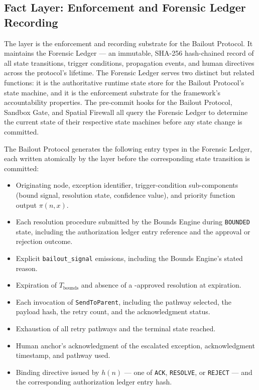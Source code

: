 \subsection{Fact Layer: Enforcement and Forensic Ledger Recording}
\label{sec:bailout-fact-layer}

The \factLayer{} layer is the enforcement and recording substrate for the Bailout
Protocol.  It maintains the Forensic Ledger --- an immutable, SHA-256
hash-chained record of all state transitions, trigger conditions, propagation
events, and human directives across the protocol's lifetime.  The Forensic
Ledger serves two distinct but related functions: it is the authoritative
runtime state store for the Bailout Protocol's state machine, and it is the
enforcement substrate for the framework's accountability properties.  The
pre-commit hooks for the Bailout Protocol, Sandbox Gate, and Spatial Firewall
all query the Forensic Ledger to determine the current state of their
respective state machines before any state change is committed.

The Bailout Protocol generates the following entry types in the Forensic
Ledger, each written atomically by the \factLayer{} layer before the corresponding
state transition is committed:

\begin{itemize}\itemsep=0pt
\item[\texttt{bailout-trigger}] Originating node, exception identifier,
  trigger-condition sub-components (bound signal, resolution state,
  confidence value), and priority function output $\pi(n, x)$.
\item[\texttt{bounds-resolution-attempt}] Each resolution procedure submitted
  by the Bounds Engine during \texttt{BOUNDED} state, including the
  authorization ledger entry reference and the \factLayer{} approval or
  rejection outcome.
\item[\texttt{bailout-signal}] Explicit \texttt{bailout\_signal} emissions,
  including the Bounds Engine's stated reason.
\item[\texttt{timeout-bounds-expired}] Expiration of $T_{\text{bounds}}$ and
  absence of a \factLayer{}-approved resolution at expiration.
\item[\texttt{escalation-sent}] Each invocation of \texttt{SendToParent},
  including the pathway selected, the payload hash, the retry count, and the
  acknowledgment status.
\item[\texttt{pathway-exhausted}] Exhaustion of all retry pathways and the
  terminal state reached.
\item[\texttt{human-ack}] Human anchor's acknowledgment of the escalated
  exception, acknowledgment timestamp, and pathway used.
\item[\texttt{human-directive}] Binding directive issued by $h(n)$ --- one of
  \texttt{ACK}, \texttt{RESOLVE}, or \texttt{REJECT} --- and the
  corresponding authorization ledger entry hash.
\end{itemize}

